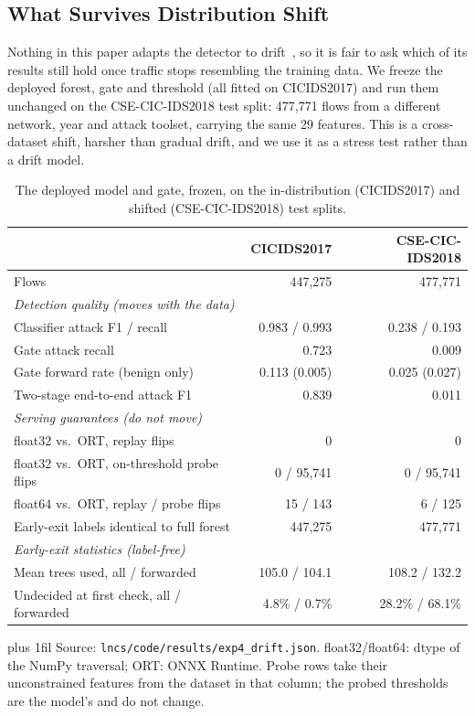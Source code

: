 \documentclass[runningheads]{llncs}
\newcommand{\tabnote}[1]{%
  \vspace{4pt}\par\noindent
  \begin{minipage}{\textwidth}%
    \footnotesize\parindent=0pt\leftskip=0pt\rightskip=0pt\parfillskip=0pt plus 1fil\relax
    #1%
  \end{minipage}}
\begin{document}
\subsection{What Survives Distribution Shift}
\label{sec:drift}

Nothing in this paper adapts the detector to drift~\cite{gama2014survey}, so it is fair to ask which of its results still hold once traffic stops resembling the training data. We freeze the deployed forest, gate and threshold (all fitted on CICIDS2017) and run them unchanged on the CSE-CIC-IDS2018 test split: 477{,}771 flows from a different network, year and attack toolset, carrying the same 29 features. This is a cross-dataset shift, harsher than gradual drift, and we use it as a stress test rather than a drift model.

\begin{table}[htbp]
  \caption{The deployed model and gate, frozen, on the in-distribution (CICIDS2017) and shifted (CSE-CIC-IDS2018) test splits.}
  \label{tab:drift}
  \centering
  \small
  \begin{tabular}{l r r}
    \toprule
     & CICIDS2017 & CSE-CIC-IDS2018 \\
    \midrule
    Flows                                         & 447{,}275 & 477{,}771 \\
    \multicolumn{3}{l}{\emph{Detection quality (moves with the data)}} \\
    \quad Classifier attack F1 / recall           & 0.983 / 0.993 & 0.238 / 0.193 \\
    \quad Gate attack recall                      & 0.723 & 0.009 \\
    \quad Gate forward rate (benign only)         & 0.113 (0.005) & 0.025 (0.027) \\
    \quad Two-stage end-to-end attack F1          & 0.839 & 0.011 \\
    \multicolumn{3}{l}{\emph{Serving guarantees (do not move)}} \\
    \quad float32 vs.\ ORT, replay flips  & 0 & 0 \\
    \quad float32 vs.\ ORT, on-threshold probe flips & 0 / 95{,}741 & 0 / 95{,}741 \\
    \quad float64 vs.\ ORT, replay / probe flips & 15 / 143 & 6 / 125 \\
    \quad Early-exit labels identical to full forest & 447{,}275 & 477{,}771 \\
    \multicolumn{3}{l}{\emph{Early-exit statistics (label-free)}} \\
    \quad Mean trees used, all / forwarded        & 105.0 / 104.1 & 108.2 / 132.2 \\
    \quad Undecided at first check, all / forwarded & 4.8\% / 0.7\% & 28.2\% / 68.1\% \\
    \bottomrule
  \end{tabular}
  \tabnote{Source: \texttt{lncs/code/results/exp4\_drift.json}. float32/float64: dtype of the NumPy traversal; ORT: ONNX Runtime. Probe rows take their unconstrained features from the dataset in that column; the probed thresholds are the model's and do not change.}
\end{table}
\end{document}
